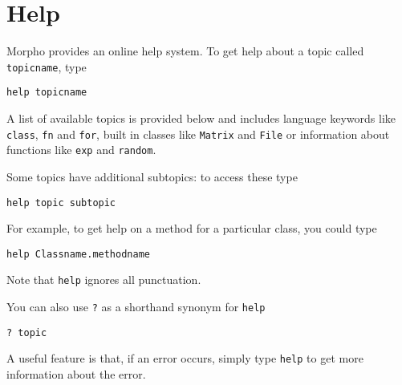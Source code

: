\hypertarget{help}{%
\section{Help}\label{help}}

Morpho provides an online help system. To get help about a topic called
\texttt{topicname}, type

\begin{lstlisting}
help topicname
\end{lstlisting}

A list of available topics is provided below and includes language
keywords like \texttt{class}, \texttt{fn} and \texttt{for}, built in
classes like \texttt{Matrix} and \texttt{File} or information about
functions like \texttt{exp} and \texttt{random}.

Some topics have additional subtopics: to access these type

\begin{lstlisting}
help topic subtopic
\end{lstlisting}

For example, to get help on a method for a particular class, you could
type

\begin{lstlisting}
help Classname.methodname
\end{lstlisting}

Note that \texttt{help} ignores all punctuation.

You can also use \texttt{?} as a shorthand synonym for \texttt{help}

\begin{lstlisting}
? topic
\end{lstlisting}

A useful feature is that, if an error occurs, simply type \texttt{help}
to get more information about the error.
